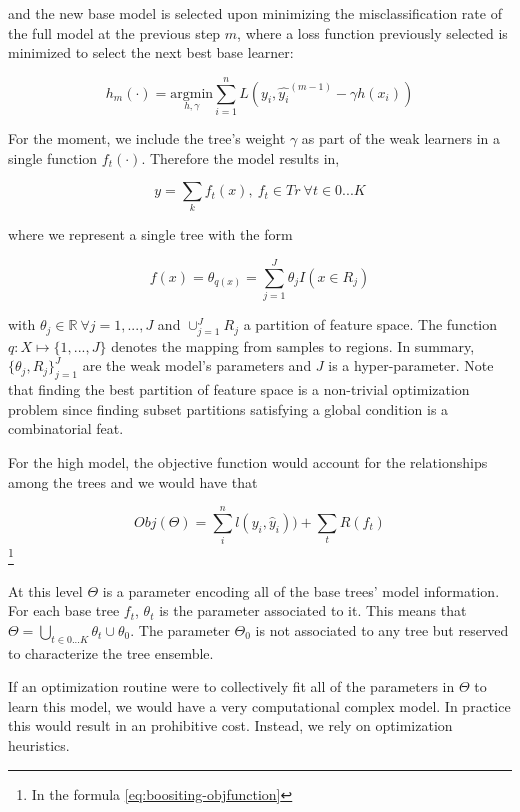 and the new base model is selected upon minimizing the misclassification rate of the full model at the previous step $m$, where a loss function previously selected is minimized to select the next best base learner:

\begin{equation}
h_m(\cdot) = \underset{h,\gamma}{\mathrm{argmin}}   \sum_{i=1}^{n} L ( y_i,  \hat{y_i}^{(m-1)} -  \gamma h(x_i)  )
\end{equation}


For the moment, we include the tree's weight $\gamma$ as part of the weak learners in a single function $f_t(\cdot)$. Therefore the model results in,

\begin{equation}
y =  \sum_k f_t(x) ,  \ f_t \in Tr  \ \forall t \in {0...K}
\end{equation}

where we represent a single tree with the form

\begin{equation}
f(x) = \theta_{q(x)} = \sum_{j=1}^J \theta_j I(x \in  R_j)
\end{equation}

with $\theta_j \in \mathbb{R} \ \forall j = 1,...,J$ and $ \cup_{j=1}^J R_j$ a partition of feature space. The function $q : X \mapsto \{1,...,J\}$ denotes the mapping from samples to regions. In summary, $\{\theta_j, R_j\}_{j=1}^J$ are the weak model's parameters and $J$ is a hyper-parameter. Note that finding the best partition of feature space is a non-trivial optimization problem since finding subset partitions satisfying a global condition is a combinatorial feat.

For the high model, the objective function would account for the relationships among the trees and we would have that

\begin{equation} 
Obj(\Theta) = \sum_i^n l(y_i,\hat{y}_i))  +  \sum_t R(f_t) 
\end{equation} \label{eq:boositing-objfunction} \footnote{In the formula \ref{eq:boositing-objfunction} }

At this level $\Theta$ is a parameter encoding all of the base trees' model information. For each base tree $f_t$, $\theta_t$ is the parameter associated to it. This means that $\Theta =  \bigcup_{t \in {0...K}} \theta_t  \cup \theta_0$.  The parameter $\Theta_0$ is not associated to any tree but reserved to characterize the tree ensemble.

If an optimization routine were to collectively fit all of the parameters in $\Theta$ to learn this model, we would have a very computational complex model. In practice this would result in an prohibitive cost. Instead, we rely on optimization heuristics.

